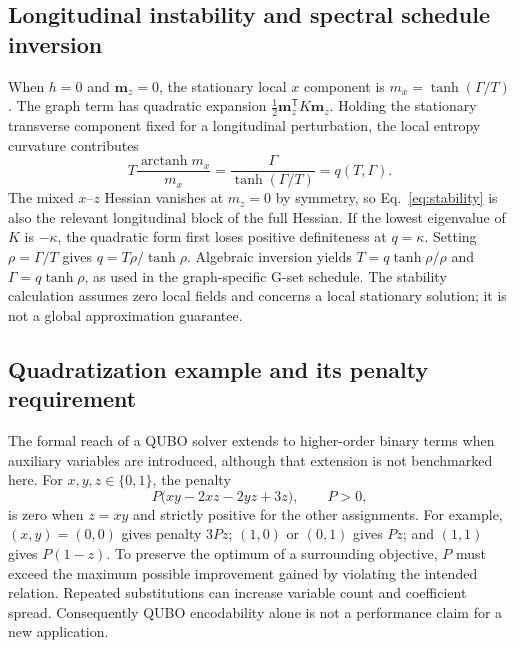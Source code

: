 \subsection{Longitudinal instability and spectral schedule inversion}

When $h=0$ and $\bm m_z=0$, the stationary local $x$ component is
$m_x=\tanh(\Gamma/T)$. The graph term has quadratic expansion
$\tfrac12\bm m_z^{\mathsf T}K\bm m_z$. Holding the stationary transverse
component fixed for a longitudinal perturbation, the local entropy
curvature contributes
\begin{equation}
 T\frac{\operatorname{arctanh}m_x}{m_x}
 =\frac{\Gamma}{\tanh(\Gamma/T)}=q(T,\Gamma).
 \label{eq:app-q}
\end{equation}
The mixed $x$--$z$ Hessian vanishes at $m_z=0$ by symmetry, so
Eq.~\eqref{eq:stability} is also the relevant longitudinal block of
the full Hessian. If the lowest eigenvalue of $K$ is $-\kappa$, the
quadratic form first loses positive definiteness at $q=\kappa$.
Setting $\rho=\Gamma/T$ gives
$q=T\rho/\tanh\rho$. Algebraic inversion yields
$T=q\tanh\rho/\rho$ and $\Gamma=q\tanh\rho$, as used in the
graph-specific G-set schedule. The stability calculation assumes zero
local fields and concerns a local stationary solution; it is not a
global approximation guarantee.

\subsection{Quadratization example and its penalty requirement}

The formal reach of a QUBO solver extends to higher-order binary terms
when auxiliary variables are introduced, although that extension is not
benchmarked here. For $x,y,z\in\{0,1\}$, the penalty
\begin{equation}
 P\bigl(xy-2xz-2yz+3z\bigr),\qquad P>0,
 \label{eq:app-quadratize}
\end{equation}
is zero when $z=xy$ and strictly positive for the other assignments.
For example, $(x,y)=(0,0)$ gives penalty $3Pz$;
$(1,0)$ or $(0,1)$ gives $Pz$; and $(1,1)$ gives $P(1-z)$.
To preserve the optimum of a surrounding objective, $P$ must exceed
the maximum possible improvement gained by violating the intended
relation. Repeated substitutions can increase variable count and
coefficient spread. Consequently QUBO encodability alone is not a
performance claim for a new application.
